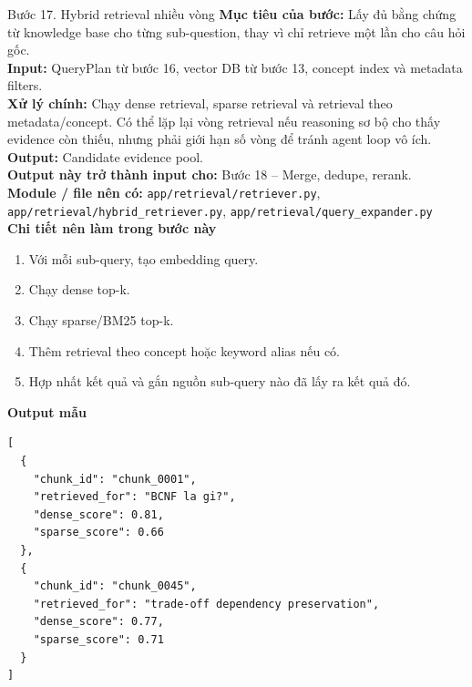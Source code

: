 \documentclass[12pt,a4paper]{article}
\newcommand{\stepgoal}[1]{\textbf{Mục tiêu của bước:} #1\\}
\newcommand{\stepinput}[1]{\textbf{Input:} #1\\}
\newcommand{\stepprocess}[1]{\textbf{Xử lý chính:} #1\\}
\newcommand{\stepoutput}[1]{\textbf{Output:} #1\\}
\newcommand{\stepnext}[1]{\textbf{Output này trở thành input cho:} #1\\}
\newcommand{\stepmodules}[1]{\textbf{Module / file nên có:} #1\\}
\begin{document}
\begin{stepbox}{Bước 17. Hybrid retrieval nhiều vòng}
\stepgoal{Lấy đủ bằng chứng từ knowledge base cho từng sub-question, thay vì chỉ retrieve một lần cho câu hỏi gốc.}
\stepinput{QueryPlan từ bước 16, vector DB từ bước 13, concept index và metadata filters.}
\stepprocess{Chạy dense retrieval, sparse retrieval và retrieval theo metadata/concept. Có thể lặp lại vòng retrieval nếu reasoning sơ bộ cho thấy evidence còn thiếu, nhưng phải giới hạn số vòng để tránh agent loop vô ích.}
\stepoutput{Candidate evidence pool.}
\stepnext{Bước 18 -- Merge, dedupe, rerank.}
\stepmodules{\texttt{app/retrieval/retriever.py}, \texttt{app/retrieval/hybrid\_retriever.py}, \texttt{app/retrieval/query\_expander.py}}

\textbf{Chi tiết nên làm trong bước này}
\begin{enumerate}[label=\arabic*.]
    \item Với mỗi sub-query, tạo embedding query.
    \item Chạy dense top-k.
    \item Chạy sparse/BM25 top-k.
    \item Thêm retrieval theo concept hoặc keyword alias nếu có.
    \item Hợp nhất kết quả và gắn nguồn sub-query nào đã lấy ra kết quả đó.
\end{enumerate}

\textbf{Output mẫu}
\begin{lstlisting}
[
  {
    "chunk_id": "chunk_0001",
    "retrieved_for": "BCNF la gi?",
    "dense_score": 0.81,
    "sparse_score": 0.66
  },
  {
    "chunk_id": "chunk_0045",
    "retrieved_for": "trade-off dependency preservation",
    "dense_score": 0.77,
    "sparse_score": 0.71
  }
]
\end{lstlisting}
\end{stepbox}
\end{document}

